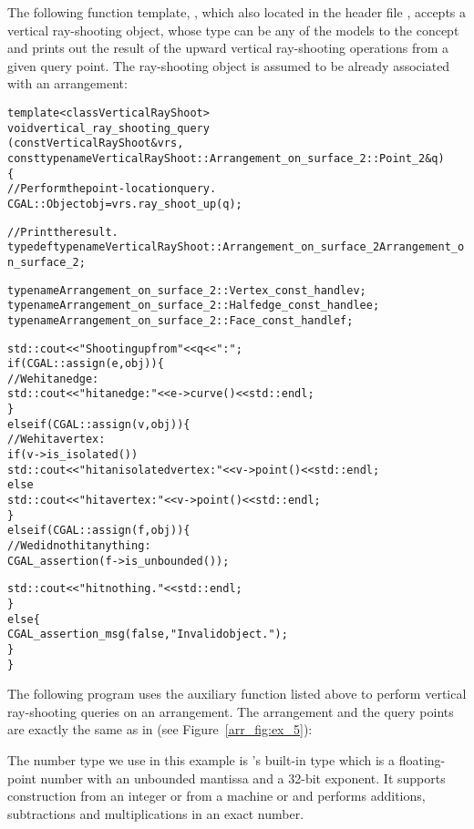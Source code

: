 The following function template, ,
which also located in the header file ,
accepts a vertical ray-shooting
object, whose type can be any of the models to the
 concept and prints out the
result of the upward vertical ray-shooting operations from a given
query point. The ray-shooting object  is assumed to be
already associated with an arrangement:

\begin{alltt}
template <class VerticalRayShoot>
void vertical_ray_shooting_query
    (const VerticalRayShoot& vrs,
     const typename VerticalRayShoot::Arrangement_on_surface_2::Point_2& q)
\{
  // Perform the point-location query.
  CGAL::Object    obj = vrs.ray_shoot_up (q);

  // Print the result.
  typedef typename VerticalRayShoot::Arrangement_on_surface_2  Arrangement_on_surface_2;

  typename Arrangement_on_surface_2::Vertex_const_handle    v;
  typename Arrangement_on_surface_2::Halfedge_const_handle  e;
  typename Arrangement_on_surface_2::Face_const_handle      f;

  std::cout << "Shooting up from " << q << " : "; 
  if (CGAL::assign (e, obj)) \{
    // We hit an edge:
    std::cout << "hit an edge: " << e->curve() << std::endl;
  \}
  else if (CGAL::assign (v, obj)) \{
    // We hit a vertex:
    if (v->is_isolated())
      std::cout << "hit an isolated vertex: " << v->point() << std::endl;
    else
      std::cout << "hit a vertex: " << v->point() << std::endl;
  \}
  else if (CGAL::assign (f, obj)) \{
    // We did not hit anything:
    CGAL_assertion (f->is_unbounded());
    
    std::cout << "hit nothing." << std::endl; 
  \}
  else \{
    CGAL_assertion_msg (false, "Invalid object.");
  \}
\}
\end{alltt}

The following program uses the auxiliary function listed above to
perform vertical ray-shooting queries on an arrangement.
The arrangement and the query points are exactly the same as in
 (see Figure~\ref{arr_fig:ex_5}):


The number type we use in this example is \cgal's built-in
 type which is a floating-point number with an
unbounded mantissa and a 32-bit exponent. It supports construction from an
integer or from a machine  or  and performs additions,
subtractions and multiplications in an exact number.

